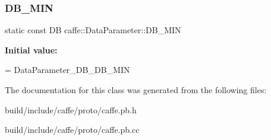 \subsubsection{\texorpdfstring{D\+B\+\_\+\+M\+IN}{DB\_MIN}}
{\footnotesize\ttfamily static const DB caffe\+::\+Data\+Parameter\+::\+D\+B\+\_\+\+M\+IN\hspace{0.3cm}{\ttfamily [static]}}

{\bfseries Initial value\+:}
\begin{DoxyCode}
=
    DataParameter\_DB\_DB\_MIN
\end{DoxyCode}


The documentation for this class was generated from the following files\+:\begin{DoxyCompactItemize}
\item 
build/include/caffe/proto/caffe.\+pb.\+h\item 
build/include/caffe/proto/caffe.\+pb.\+cc\end{DoxyCompactItemize}
